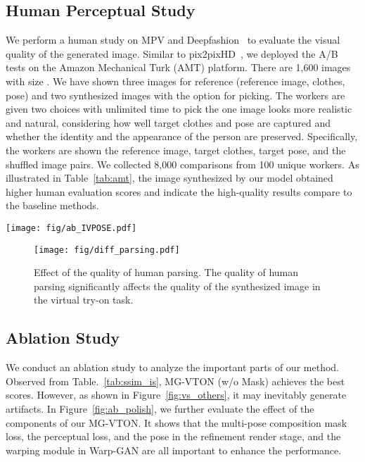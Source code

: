 \documentclass[10pt,twocolumn,letterpaper]{article}
\begin{document}
\subsection{Human Perceptual Study}
We perform a human study on MPV and Deepfashion~\cite{liu2016deepfashion} to evaluate the visual quality of the generated image. Similar to pix2pixHD~\cite{wang2017pix2pixHD}, we deployed the A/B tests on the Amazon Mechanical Turk (AMT) platform. There are 1,600 images with size . We have shown three images for reference (reference image, clothes, pose) and two synthesized images with the option for picking. The workers are given two choices with unlimited time to pick the one image looks more realistic and natural, considering how well target clothes and pose are captured and whether the identity and the appearance of the person are preserved. Specifically, the workers are shown the reference image, target clothes, target pose, and the shuffled image pairs. We collected 8,000 comparisons from 100 unique workers. As illustrated in Table~\ref{tab:amt}, the image synthesized by our model obtained higher human evaluation scores and indicate the high-quality results compare to the baseline methods.




\begin{figure*}[!thp]
\centering
\texttt{[image: fig/ab\_IVPOSE.pdf]} 
\caption{Ablation study on our collected dataset MPV. Zoom in for details.}
\label{fig:ab_polish}
\vspace{-4mm}
\end{figure*}


\begin{figure}[!tp]
\centering
\texttt{[image: fig/diff\_parsing.pdf]} 
\caption{Effect of the quality of human parsing. The quality of human parsing significantly affects the quality of the synthesized image in the virtual try-on task.}
\label{fig:diff_parsing}
\vspace{-4mm}
\end{figure}



\subsection{Ablation Study}
We conduct an ablation study to analyze the important parts of our method. Observed from Table.~\ref{tab:ssim_is}, MG-VTON (w/o Mask) achieves the best scores. However, as shown in Figure~\ref{fig:vs_others}, it may inevitably generate artifacts. In Figure~\ref{fig:ab_polish}, we further evaluate the effect of the components of our MG-VTON. It shows that the multi-pose composition mask loss, the perceptual loss, and the pose in the refinement render stage, and the warping module in Warp-GAN are all important to enhance the performance.
\end{document}
